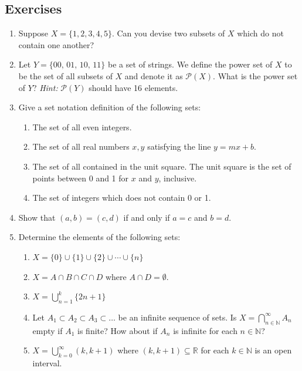\documentclass[12pt]{book}
\def\N{{\mathbb{N}}}
\def\R{{\mathbb{R}}}
\begin{document}
\subsection*{Exercises}
\begin{enumerate}
\item Suppose $X=\{1,2,3,4,5\}$. Can you devise two subsets of $X$ which do not contain one another?

\item Let $Y=\{\text{00, 01, 10, 11}\}$ be a set of strings. We define the power set of $X$ to be the set of all subsets of $X$ and denote it as $\mathscr{P}(X)$. What is the power set of $Y$? \textit{Hint:} $\mathscr{P}(Y)$ should have 16 elements.

\item Give a set notation definition of the following sets:
	\begin{enumerate}[nolistsep]
	\item The set of all even integers.
	\item The set of all real numbers $x,y$ satisfying the line $y=mx+b$.
	\item The set of all contained in the unit square. The unit square is the set of points between 0 and 1 for $x$ and $y$, inclusive.
	\item The set of integers which does not contain 0 or 1.
	\end{enumerate}

\item Show that $(a,b)=(c,d)$ if and only if $a=c$ and $b=d$.

\item Determine the elements of the following sets:
	\begin{enumerate}[nolistsep]
	\item $\displaystyle X=\{0\}\cup\{1\}\cup\{2\}\cup\cdots\cup\{n\}$
	\item $\displaystyle X=A\cap B\cap C\cap D$ where $A\cap D=\emptyset$.
	\item $\displaystyle X=\bigcup_{n=1}^k\{2n+1\}$
	\item Let $A_1\subset A_2\subset A_3\subset\ldots$ be an infinite sequence of sets. Is $\displaystyle X=\bigcap_{n\in\N}^\infty A_n$ empty if $A_1$ is finite? How about if $A_n$ is infinite for each $n\in\N$? 
	\item $\displaystyle X=\bigcup_{k=0}^\infty (k,k+1)$ where $(k,k+1)\subseteq\R$ for each $k\in\N$ is an open interval.
	\end{enumerate}


\end{enumerate}
\end{document}
